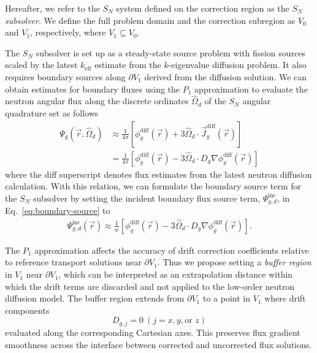 Hereafter, we refer to the $S_N$ system defined on the correction
region as the $S_N$ \textit{subsolver}. We define the full problem
domain and the correction subregion as $V_0$ and $V_1$, respectively, where
$V_1\subseteq V_0$.


The $S_N$ subsolver is set up as a steady-state source problem with fission sources scaled by
the latest $k_\text{eff}$ estimate from the $k$-eigenvalue diffusion problem.
It also requires boundary sources along $\partial V_1$ derived from the
diffusion solution. We can obtain estimates for boundary fluxes
using the $P_1$ approximation to evaluate the neutron angular flux along
the discrete ordinates $\hat{\Omega}_d$ of the $S_N$ angular quadrature set as follows
%
\begin{align}
  \Psi_g(\vec{r},\hat{\Omega}_d) &\approx \frac{1}{4\pi}\left[\phi^\text{diff}_g(\vec{r})+
  3\hat{\Omega}_d\cdot\vec{J}^\text{diff}_g(\vec{r})\right] \nonumber \\
  &=\frac{1}{4\pi}\left[\phi^\text{diff}_g(\vec{r})-
  3\hat{\Omega}_d\cdot D_g\nabla\phi^\text{diff}_g(\vec{r})\right]
\end{align}
%
where the diff superscript denotes flux estimates from the latest neutron diffusion calculation.
With this relation, we can formulate the boundary source term for the $S_N$ subsolver by setting
the incident boundary flux source term,
$\Psi^\text{inc}_{g,d}$, in Eq.\ \ref{eq:boundary-source} to
%
\begin{gather}
  \Psi^\text{inc}_{g,d}(\vec{r}) \approx \frac{1}{w}
  \left[\phi^\text{diff}_g(\vec{r})-3\hat{\Omega}_d\cdot D_g\nabla\phi^\text{diff}_g(\vec{r})\right].
  \label{eq:p1-boundary}
\end{gather}

The $P_1$ approximation affects the accuracy of drift correction coefficients relative to reference
transport solutions near $\partial V_1$. Thus we propose setting a \textit{buffer region} in $V_1$
near $\partial V_1$, which can be interpreted as an extrapolation distance within which the drift
terms are discarded and not applied to the low-order neutron diffusion model. The buffer region
extends from $\partial V_1$ to a point in $V_1$ where drift components
%
\begin{equation}
  D_{g,j}=0\ \left(j=x,y,\mbox{or }z\right) \label{eq:cutoff}
\end{equation}
%
evaluated along the corresponding Cartesian axes. This preserves flux gradient smoothness across
the interface between corrected and uncorrected flux solutions.

